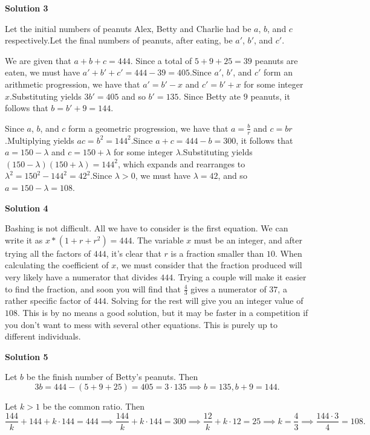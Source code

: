 \begin{enumerate}
 



\textbf{Solution 3}

Let the initial numbers of peanuts Alex, Betty and Charlie had be $a$, $b$, and $c$ respectively.Let the final numbers of peanuts, after eating, be $a'$, $b'$, and $c'$.

 We are given that $a + b + c = 444$. Since a total of $5 + 9 + 25 = 39$ peanuts are eaten, we must have $a' + b' + c' = 444 - 39 = 405$.Since $a'$, $b'$, and $c'$ form an arithmetic progression, we have that $a' = b' - x$ and $c' = b' + x$ for some integer $x$.Substituting yields $3b' = 405$ and so $b' = 135$. Since Betty ate $9$ peanuts, it follows that $b = b' + 9 = 144$.

 Since $a$, $b$, and $c$ form a geometric progression, we have that $a = \frac{b}{r}$ and $c = br$.Multiplying yields $ac = b^2 = 144^2$.Since $a + c = 444 - b = 300$, it follows that $a = 150 - \lambda$ and $c = 150 + \lambda$ for some integer $\lambda$.Substituting yields $(150-\lambda)(150+\lambda) = 144^2$, which expands and rearranges to $\lambda^2 = 150^2-144^2 = 42^2$.Since $\lambda > 0$, we must have $\lambda = 42$, and so $a = 150 - \lambda = \boxed{108}$.

 



\textbf{Solution 4}

Bashing is not difficult. All we have to consider is the first equation. We can write it as $x*(1+r+r^2) = 444$. The variable $x$ must be an integer, and after trying all the factors of $444$, it's clear that $r$ is a fraction smaller than $10$. When calculating the coefficient of $x$, we must consider that the fraction produced will very likely have a numerator that divides $444$. Trying a couple will make it easier to find the fraction, and soon you will find that $\frac{4}{3}$ gives a numerator of $37$, a rather specific factor of $444$. Solving for the rest will give you an integer value of $\boxed{108}$. This is by no means a good solution, but it may be faster in a competition if you don't want to mess with several other equations. This is purely up to different individuals.

 



\textbf{Solution 5}

Let $b$ be the finish number of Betty's peanuts. Then
 \[3b = 444-(5 + 9 + 25) = 405 = 3 \cdot 135 \implies b = 135, b+ 9 = 144.\]

 Let $k > 1$ be the common ratio. Then 
 \[\frac{144}{k} + 144 + k \cdot 144 = 444 \implies \frac{144}{k} + k \cdot 144 = 300\implies  \frac{12}{k} + k \cdot 12 = 25\implies k = \frac{4}{3} \implies \frac {144\cdot 3}{4} = \boxed {108}.\]


\end{enumerate}
